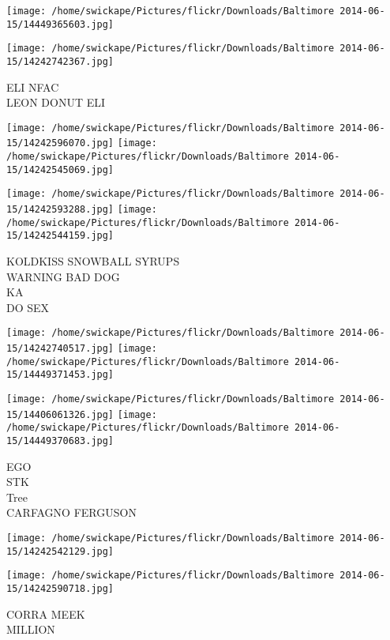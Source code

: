 \documentclass[10pt,letterpaper]{article}
\begin{document}
\texttt{[image: /home/swickape/Pictures/flickr/Downloads/Baltimore 2014-06-15/14449365603.jpg]}

\vspace{0.25in}
\texttt{[image: /home/swickape/Pictures/flickr/Downloads/Baltimore 2014-06-15/14242742367.jpg]}

ELI NFAC\\
LEON DONUT ELI\\
\pagebreak

\texttt{[image: /home/swickape/Pictures/flickr/Downloads/Baltimore 2014-06-15/14242596070.jpg]}
\texttt{[image: /home/swickape/Pictures/flickr/Downloads/Baltimore 2014-06-15/14242545069.jpg]}

\texttt{[image: /home/swickape/Pictures/flickr/Downloads/Baltimore 2014-06-15/14242593288.jpg]}
\texttt{[image: /home/swickape/Pictures/flickr/Downloads/Baltimore 2014-06-15/14242544159.jpg]}

KOLDKISS SNOWBALL SYRUPS\\
WARNING BAD DOG\\
KA\\
DO SEX\\
\pagebreak

\texttt{[image: /home/swickape/Pictures/flickr/Downloads/Baltimore 2014-06-15/14242740517.jpg]}
\texttt{[image: /home/swickape/Pictures/flickr/Downloads/Baltimore 2014-06-15/14449371453.jpg]}

\texttt{[image: /home/swickape/Pictures/flickr/Downloads/Baltimore 2014-06-15/14406061326.jpg]}
\texttt{[image: /home/swickape/Pictures/flickr/Downloads/Baltimore 2014-06-15/14449370683.jpg]}

EGO\\
STK\\
Tree\\
CARFAGNO FERGUSON\\
\pagebreak

\texttt{[image: /home/swickape/Pictures/flickr/Downloads/Baltimore 2014-06-15/14242542129.jpg]}

\vspace{0.25in}
\texttt{[image: /home/swickape/Pictures/flickr/Downloads/Baltimore 2014-06-15/14242590718.jpg]}

CORRA MEEK\\
MILLION\\
\pagebreak
\end{document}
